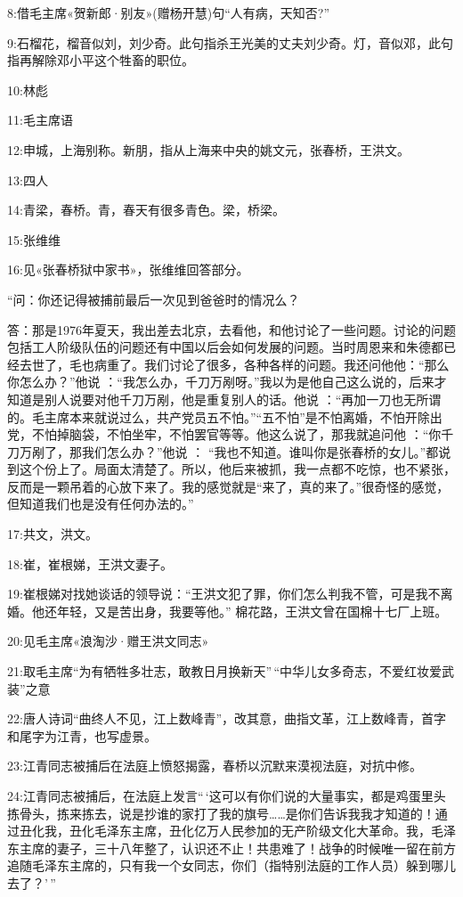 \documentclass[
]{article}
\begin{document}
8:借毛主席«贺新郎·别友»(赠杨开慧)句``人有病，天知否?''

9:石榴花，榴音似刘，刘少奇。此句指杀王光美的丈夫刘少奇。灯，音似邓，此句指再解除邓小平这个牲畜的职位。

10:林彪

11:毛主席语

12:申城，上海别称。新朋，指从上海来中央的姚文元，张春桥，王洪文。

13:四人

14:青梁，春桥。青，春天有很多青色。梁，桥梁。

15:张维维

16:见«张春桥狱中家书»，张维维回答部分。

``问：你还记得被捕前最后一次见到爸爸时的情况么？

答：那是1976年夏天，我出差去北京，去看他，和他讨论了一些问题。讨论的问题包括工人阶级队伍的问题还有中国以后会如何发展的问题。当时周恩来和朱德都已经去世了，毛也病重了。我们讨论了很多，各种各样的问题。我还问他他：``那么你怎么办？''他说
：``我怎么办，千刀万剐呀。''我以为是他自己这么说的，后来才知道是别人说要对他千刀万剐，他是重复别人的话。他说
：``再加一刀也无所谓的。毛主席本来就说过么，共产党员五不怕。''``五不怕''是不怕离婚，不怕开除出党，不怕掉脑袋，不怕坐牢，不怕罢官等等。他这么说了，那我就追问他
：``你千刀万剐了，那我们怎么办？''他说 ：
``我也不知道。谁叫你是张春桥的女儿。''都说到这个份上了。局面太清楚了。所以，他后来被抓，我一点都不吃惊，也不紧张，反而是一颗吊着的心放下来了。我的感觉就是``来了，真的来了。''很奇怪的感觉，但知道我们也是没有任何办法的。''

17:共文，洪文。

18:崔，崔根娣，王洪文妻子。

19:崔根娣对找她谈话的领导说：``王洪文犯了罪，你们怎么判我不管，可是我不离婚。他还年轻，又是苦出身，我要等他。''
棉花路，王洪文曾在国棉十七厂上班。

20:见毛主席«浪淘沙·赠王洪文同志»

21:取毛主席``为有牺牲多壮志，敢教日月换新天''\,``中华儿女多奇志，不爱红妆爱武装''之意

22:唐人诗词``曲终人不见，江上数峰青''，改其意，曲指文革，江上数峰青，首字和尾字为江青，也写虚景。

23:江青同志被捕后在法庭上愤怒揭露，春桥以沉默来漠视法庭，对抗中修。

24:江青同志被捕后，在法庭上发言``\,`这可以有你们说的大量事实，都是鸡蛋里头拣骨头，拣来拣去，说是抄谁的家打了我的旗号\ldots\ldots 是你们告诉我我才知道的！通过丑化我，丑化毛泽东主席，丑化亿万人民参加的无产阶级文化大革命。我，毛泽东主席的妻子，三十八年整了，认识还不止！共患难了！战争的时候唯一留在前方追随毛泽东主席的，只有我一个女同志，你们（指特别法庭的工作人员）躲到哪儿去了？'\,''
\end{document}
